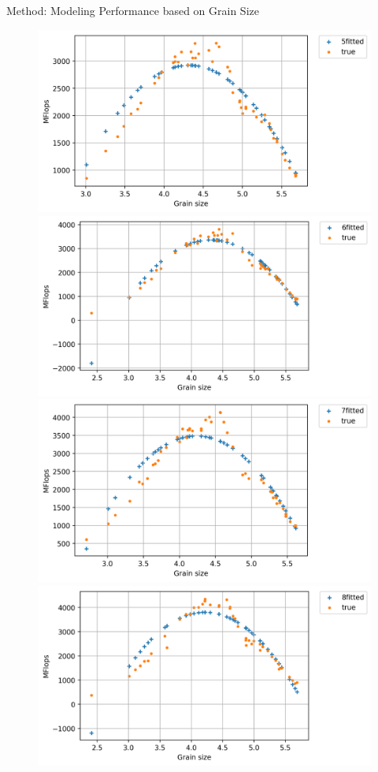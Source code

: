 \documentclass[10pt]{beamer}
\begin{document}
\begin{frame}{Method: Modeling Performance based on Grain Size}
\begin{outline}
\begin{figure}[H]
			{\includegraphics[scale=.2]{images/polyfit/fig_5_690.png}\label{fig10:e}}
			{\includegraphics[scale=.2]{images/polyfit/fig_6_690.png}\label{fig10:f}}{\hfill}
			{\includegraphics[scale=.2]{images/polyfit/fig_7_690.png}\label{fig10:g}}
			{\includegraphics[scale=.2]{images/polyfit/fig_8_690.png}\label{fig10:h}}
			

\end{figure}
\end{outline}
\end{frame}
\end{document}
